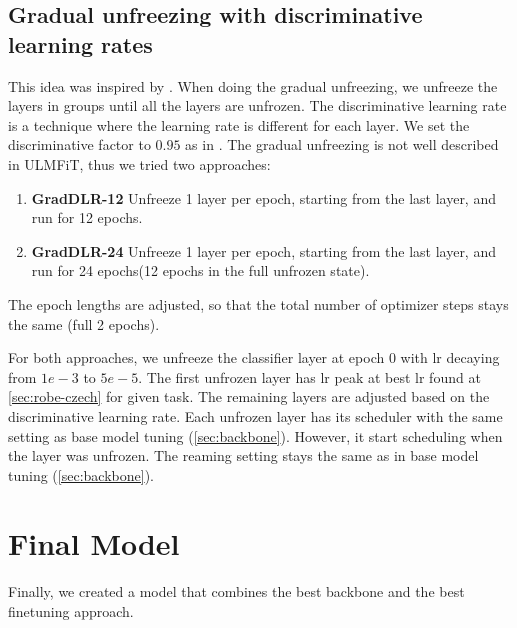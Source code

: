 \subsection{Gradual unfreezing with discriminative learning rates}
\label{sec:gradual-unfreezing}
This idea was inspired by \cite{howardUniversalLanguageModel2018a}.
When doing the gradual unfreezing, we unfreeze the layers in groups until all the layers are unfrozen.
The discriminative learning rate is a technique where the learning rate is different for each layer.
We set the discriminative factor to $0.95$ as in \cite{sunHowFineTuneBERT2020}.
The gradual unfreezing is not well described in ULMFiT, thus we tried two approaches:
\begin{enumerate}
    \item \textbf{GradDLR-12} Unfreeze 1 layer per epoch, starting from the last layer, and run for 12 epochs.
    \item \textbf{GradDLR-24} Unfreeze 1 layer per epoch,
    starting from the last layer, and run for 24 epochs(12 epochs in the full unfrozen state).
\end{enumerate}
The epoch lengths are adjusted, so that the total number of optimizer steps stays the same (full 2 epochs).

For both approaches, we unfreeze the classifier layer at epoch 0 with lr decaying from $1e-3$ to $ 5e-5$.
The first unfrozen layer has lr peak at best lr found at \autoref{sec:robe-czech} for given task.
The remaining layers are adjusted based on the discriminative learning rate.
Each unfrozen layer has its scheduler with the same setting as base model tuning (\autoref{sec:backbone}).
 However, it start scheduling when the layer was unfrozen.
The reaming setting stays the same as in base model tuning (\autoref{sec:backbone}).

\section{Final Model}
\label{sec:final-model}
Finally, we created a model that combines the best backbone and the best finetuning approach.
